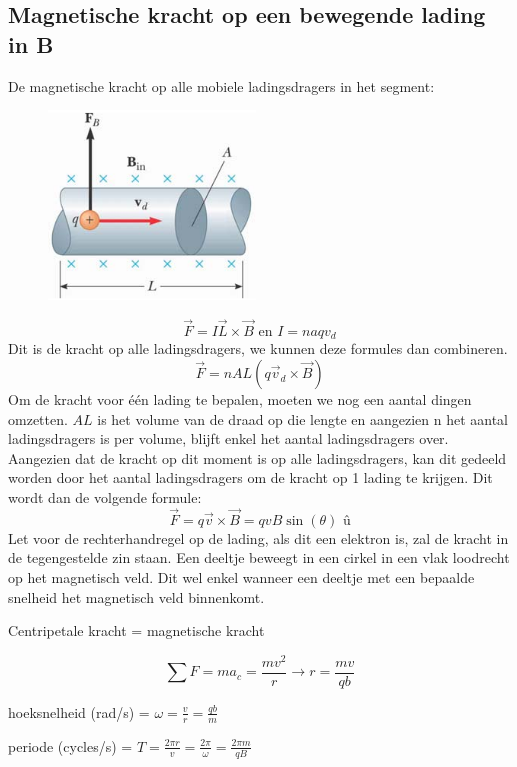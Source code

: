 \documentclass[12pt,a4paper]{article}
\begin{document}
	\subsection{Magnetische kracht op een bewegende lading in B}
	De magnetische kracht op alle mobiele ladingsdragers in het segment: 
	\begin{figure}[h]
		\centering
		\includegraphics[width=0.4\linewidth]{images/27.4}
	\end{figure}
	\[\vec{F} = I\vec{L}\times\vec{B} \text{  en  } I = naqv_d\]
	Dit is de kracht op alle ladingsdragers, we kunnen deze formules dan combineren. 
	\[\vec{F} = nAL(q\vec{v}_d\times\vec{B})\]
	Om de kracht voor één lading te bepalen, moeten we nog een aantal dingen omzetten. \(AL\) is het volume van de draad op die lengte en aangezien n het aantal ladingsdragers is per volume, blijft enkel het aantal ladingsdragers over. Aangezien dat de kracht op dit moment is op alle ladingsdragers, kan dit gedeeld worden door het aantal ladingsdragers om de kracht op 1 lading te krijgen. Dit wordt dan de volgende formule: 
	\[\vec{F} = q\vec{v}\times\vec{B} = qvB\sin(\theta)\text{ û}\] 
	Let voor de rechterhandregel op de lading, als dit een elektron is, zal de kracht in de tegengestelde zin staan. 
	\newline
	\newline
	Een deeltje beweegt in een cirkel in een vlak loodrecht op het magnetisch veld. Dit wel enkel wanneer een deeltje met een bepaalde snelheid het magnetisch veld binnenkomt. 
	
	Centripetale kracht = magnetische kracht
	
	\[\sum F = ma_c = \frac{mv^2}{r} \rightarrow r = \frac{mv}{qb}\]
	
	hoeksnelheid (rad/s) = \(\omega = \frac{v}{r} = \frac{qb}{m}\)
	
	periode (cycles/s) = \(T = \frac{2\pi r}{v} = \frac{2\pi}{\omega} = \frac{2\pi m}{qB}\) 
	
\end{document}
